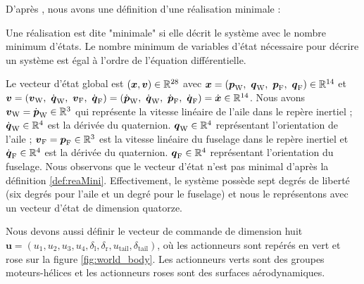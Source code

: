 D'après \cite{Tangirala2015}, nous avons une définition d'une réalisation minimale : 
\begin{definition}
    \label{def:reaMini}
    Une réalisation est dite "minimale" si elle décrit le système avec le nombre minimum d'états. Le nombre minimum de variables d'état nécessaire pour décrire un système est égal à l'ordre de l'équation différentielle.
\end{definition}


Le vecteur d'état global est $(\boldsymbol{x},\boldsymbol{v}) \in {\mathbb R}^{28}$ avec $\boldsymbol{x}=(\boldsymbol{p}_{\text{W}},~\boldsymbol{q}_{\text{W}},~\boldsymbol{p}_{\text{F}},~\boldsymbol{q}_{\text{F}}) \in {\mathbb R}^{14}$ et $\boldsymbol{v}=(\boldsymbol{v}_{\text{W}},~\dot{\boldsymbol{q}}_{\text{W}},~\boldsymbol{v}_{\text{F}},~\dot{\boldsymbol{q}}_{\text{F}}) = (\dot{\boldsymbol{p}}_{\text{W}},~\dot{\boldsymbol{q}}_{\text{W}},~\dot{\boldsymbol{p}}_{\text{F}},~\dot{\boldsymbol{q}}_{\text{F}})=\dot{\boldsymbol{x}} \in {\mathbb R}^{14}$. Nous avons $\boldsymbol{v}_{\text{W}} = \dot{\boldsymbol{p}}_{\text{W}} \in {\mathbb R}^{3}$ qui représente la vitesse linéaire de l'aile dans le repère inertiel ; $\dot{\boldsymbol{q}}_{\text{W}} \in {\mathbb R}^{4}$  est la dérivée du quaternion. $\boldsymbol{q}_{\text{W}} \in {\mathbb R}^{4}$ représentant l'orientation de l'aile ; $\boldsymbol{v}_{\text{F}} =\boldsymbol{p}_{\text{F}} \in {\mathbb R}^{3}$  est la vitesse linéaire du fuselage dans le repère inertiel et $\dot{\boldsymbol{q}}_{\text{F}} \in {\mathbb R}^{4}$  est la dérivée du quaternion. $\boldsymbol{q}_{\text{F}} \in {\mathbb R}^{4}$ représentant l'orientation du fuselage. Nous observons que le vecteur d'état n'est pas minimal d'après la définition \ref{def:reaMini}. Effectivement, le système possède sept degrés de liberté (six degrés pour l'aile et un degré pour le fuselage) et nous le représentons avec un vecteur d'état de dimension quatorze.

Nous devons aussi définir le vecteur de commande de dimension huit $\boldsymbol{u} = (u_{1},u_{2},u_{3},u_{4},\delta_{\text{l}},\delta_{\text{r}},u_{\text{tail}},\delta_{\text{tail}})$, où les actionneurs sont repérés en vert et rose sur la figure \ref{fig:world_body}. Les actionneurs verts sont des groupes moteurs-hélices et les actionneurs roses sont des surfaces aérodynamiques. 

